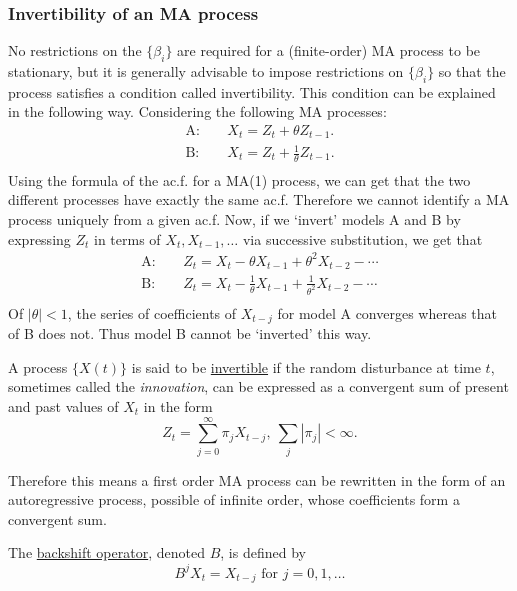 \subsubsection{Invertibility of an MA process}
No restrictions on the $\{ \beta_i \}$ are required for a (finite-order) MA process to be stationary, but it is 
generally advisable to impose restrictions on $\{ \beta_i \}$ so that the process satisfies a condition called 
invertibility. This condition can be explained in the following way. Considering the following MA processes:
\begin{align*}
	\mathrm{A}: \quad & X_t = Z_t + \theta Z_{t-1}. \\
	\mathrm{B}: \quad & X_t = Z_t + \frac{1}{\theta} Z_{t-1}. \\
\end{align*}
Using the formula of the ac.f. for a MA(1) process, we can get that the two different processes have exactly the 
same ac.f. Therefore we cannot identify a MA process uniquely from a given ac.f. Now, if we `invert' models A 
and B by expressing $Z_t$ in terms of $X_t, X_{t-1}, \dots$ via successive substitution, we get that 
\begin{align*}
	\mathrm{A}: \quad & Z_t = X_t - \theta X_{t-1} + \theta^2 X_{t-2} - \cdots \\
	\mathrm{B}: \quad & Z_t = X_t - \frac{1}{\theta} X_{t-1} + \frac{1}{\theta^2} X_{t-2} - \cdots \\
\end{align*}
Of $|\theta| < 1$, the series of coefficients of $X_{t-j}$ for model A converges whereas that of B does not. 
Thus model B cannot be `inverted' this way.

\begin{definition*}[]
A process $\{ X(t) \}$ is said to be \underline{invertible} if the random disturbance at time $t$, sometimes 
called the \textit{innovation}, can be expressed as a convergent sum of present and past values of $X_t$ in the 
form 
\[ Z_t = \sum_{j = 0}^{\infty} \pi_j X_{t-j}, \ \sum_{j}^{} |\pi_j| < \infty. \]
\end{definition*}
Therefore this means a first order MA process can be rewritten in the form of an autoregressive process, 
possible of infinite order, whose coefficients form a convergent sum.

\begin{definition*}[]
The \underline{backshift operator}, denoted $B$, is defined by 
\[ B^j X_t = X_{t-j} \text{ for } j = 0, 1, \dots \]
\end{definition*}

